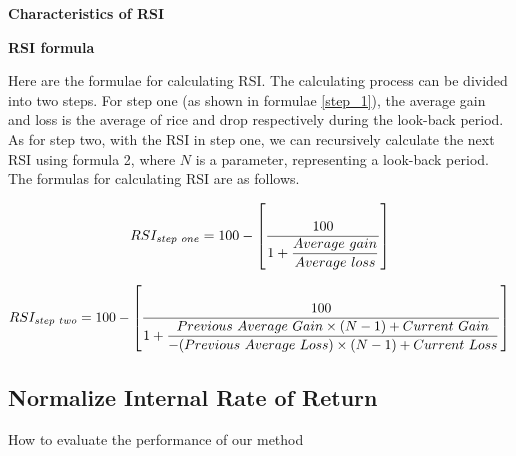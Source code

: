 \documentclass[../main.tex]{subfiles}
\begin{document}
\textbf{Characteristics of RSI}

\textbf{RSI formula}

Here are the formulae for calculating RSI. The calculating process can be divided into two steps. For step one (as shown in formulae \ref{step_1}), the average gain and loss is the average of rice and drop respectively during the look-back period. As for step two, with the RSI in step one, we can recursively calculate the next RSI using formula 2, where $N$ is a parameter, representing a look-back period. The formulas for calculating RSI are as follows.

\begin{equation}\label{step_1}\scalebox{1}
    {$RSI_{step\ one}=100-\left[\dfrac{100}{1+\dfrac{Average\ gain}{Average\ loss}}\right]$}
    \vspace{1em}
\end{equation}

\begin{equation}\label{step_2}\scalebox{1}
    {$RSI_{step\ two}=100-\left[\dfrac{100}{1+\dfrac{Previous\ Average\ Gain\times(N-1)+Current\ Gain}{-(Previous\ Average\ Loss)\times(N-1)+Current\ Loss}}\right]$}
    \vspace{1em}
\end{equation}

\subsection{Normalize Internal Rate of Return}
How to evaluate the performance of our method





\end{document}
